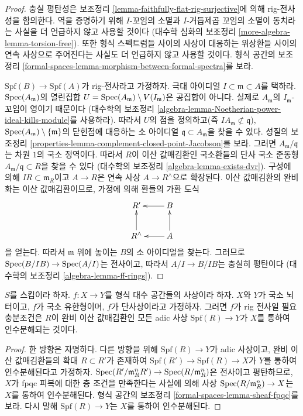 \begin{proof}
충실 평탄성은 보조정리 \ref{lemma-faithfully-flat-rig-surjective}에 의해
rig-전사성을 함의한다. 역을 증명하기 위해 $I$-꼬임의 소멸과
$I$-거듭제곱 꼬임의 소멸이 동치라는 사실을 더 언급하지 않고 사용할 것이다
(대수학 심화의 보조정리 \ref{more-algebra-lemma-torsion-free}).
또한 형식 스펙트럼들 사이의 사상이 대응하는 위상환들 사이의 연속 사상으로
주어진다는 사실도 더 언급하지 않고 사용할 것이다. 형식 공간의 보조정리
\ref{formal-spaces-lemma-morphism-between-formal-spectra}를 보라.

\medskip\noindent
$\text{Spf}(B) \to \text{Spf}(A)$가 rig-전사라고 가정하자.
극대 아이디얼 $I \subset \mathfrak m \subset A$를 택하라.
$\mathop{\mathrm{Spec}}(A_\mathfrak m)$의 열린집합
$U = \mathop{\mathrm{Spec}}(A_\mathfrak m) \setminus V(I_\mathfrak m)$은 공집합이 아니다.
실제로 $A_\mathfrak m$의 $I_\mathfrak m$-꼬임이 영이기 때문이다
(대수학의 보조정리
\ref{algebra-lemma-Noetherian-power-ideal-kills-module}를 사용하라).
따라서 $U$의 점을 정의하고(즉 $IA_\mathfrak m \not \subset \mathfrak q$),
$\mathop{\mathrm{Spec}}(A_\mathfrak m) \setminus \{\mathfrak m\}$의 닫힌점에 대응하는
소 아이디얼 $\mathfrak q \subset A_\mathfrak m$을 찾을 수 있다. 성질의
보조정리 \ref{properties-lemma-complement-closed-point-Jacobson}를 보라.
그러면 $A_\mathfrak m/\mathfrak q$는 차원 $1$의 국소 정역이다. 따라서
$R$이 이산 값매김환인 국소환들의 단사 국소 준동형
$A_\mathfrak m/\mathfrak q \subset R$을 찾을 수 있다
(대수학의 보조정리 \ref{algebra-lemma-exists-dvr}). 구성에 의해
$IR \subset \mathfrak m_R$이고 $A \to R$은 연속 사상
$A \to R^\wedge$으로 확장된다. 이산 값매김환의 완비화는 이산 값매김환이므로,
가정에 의해 환들의 가환 도식
$$
\xymatrix{
R' & B \ar[l] \\
R^\wedge \ar[u] & A \ar[l] \ar[u]
}
$$
을 얻는다. 따라서 $\mathfrak m$ 위에 놓이는 $B$의 소 아이디얼을 찾는다.
그러므로 $\mathop{\mathrm{Spec}}(B/IB) \to \mathop{\mathrm{Spec}}(A/I)$는 전사이고, 따라서
$A/I \to B/IB$는 충실히 평탄이다
(대수학의 보조정리 \ref{algebra-lemma-ff-rings}).
\end{proof}

\begin{lemma}
\label{lemma-monomorphism-rig-surjective}
$S$를 스킴이라 하자. $f : X \to Y$를 형식 대수 공간들의 사상이라 하자.
$X$와 $Y$가 국소 뇌터이고, $f$가 국소 유한형이며, $f$가 단사상이라고
가정하자. 그러면 $f$가 rig 전사일 필요충분조건은 $R$이 완비 이산
값매김환인 모든 adic 사상 $\text{Spf}(R) \to Y$가 $X$를 통하여
인수분해되는 것이다.
\end{lemma}

\begin{proof}
한 방향은 자명하다. 다른 방향을 위해 $\text{Spf}(R) \to Y$가 adic
사상이고, 완비 이산 값매김환들의 확대 $R \subset R'$가 존재하여
$\text{Spf}(R') \to \text{Spf}(R) \to X$가 $Y$를 통하여 인수분해된다고
가정하자. $\mathop{\mathrm{Spec}}(R'/\mathfrak m_R^n R') \to
\mathop{\mathrm{Spec}}(R/\mathfrak m_R^n)$은 전사이고 평탄하므로, $X$가 fpqc 피복에 대한
층 조건을 만족한다는 사실에 의해 사상
$\mathop{\mathrm{Spec}}(R/\mathfrak m_R^n) \to X$는 $X$를 통하여 인수분해된다. 형식 공간의
보조정리 \ref{formal-spaces-lemma-sheaf-fpqc}를 보라. 다시 말해
$\text{Spf}(R) \to Y$는 $X$를 통하여 인수분해된다.
\end{proof}

